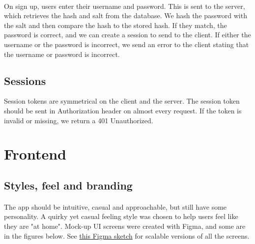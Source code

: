 \documentclass{report}
\begin{document}
\paragraph{}
On sign up, users enter their username and password. This is sent to the server, which retrieves the hash and salt from the database. We hash the password with the salt and then compare the hash to the stored hash. If they match, the password is correct, and we can create a session to send to the client. If either the username or the password is incorrect, we send an error to the client stating that the username or password is incorrect.

\subsection{Sessions}
Session tokens are symmetrical on the client and the server. The session token should be sent in Authorization header on almost every request. If the token is invalid or missing, we return a 401 Unauthorized.

\section{Frontend}
\subsection{Styles, feel and branding}
\paragraph{}
The app should be intuitive, casual and approachable, but still have some personality. A quirky yet casual feeling style was chosen to help users feel like they are "at home". Mock-up UI screens were created with Figma, and some are in the figures below. See \href{https://www.figma.com/file/7vs7errfunZKlr1wT6j52Z/faded}{this Figma sketch} for scalable versions of all the screens.
\end{document}
